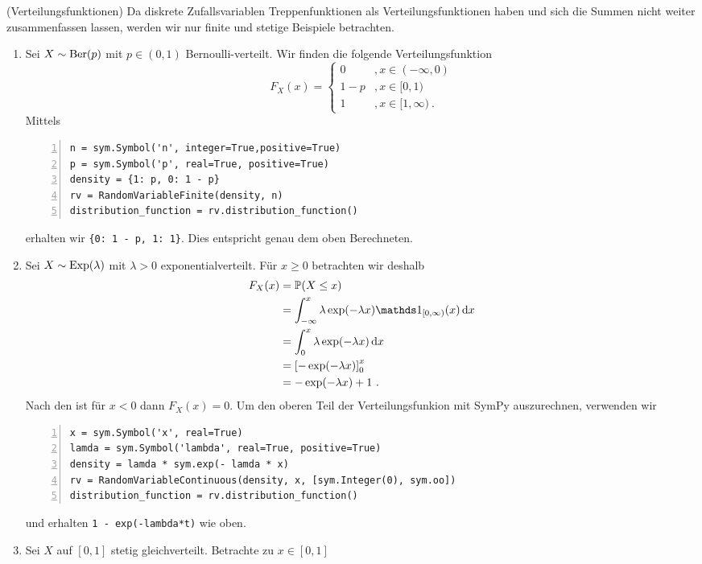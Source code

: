 \begin{Beispiel}{(Verteilungsfunktionen)}
\hypertarget{Bsp:VertFun}{}Da diskrete Zufallsvariablen Treppenfunktionen als Verteilungsfunktionen haben und sich die Summen nicht weiter zusammenfassen lassen, werden wir nur finite und stetige Beispiele betrachten.
\begin{enumerate}[label=(\roman*)]
\item Sei $X \sim \operatorname{Ber}(p)$ mit $p \in (0, 1)$ Bernoulli-verteilt. Wir finden die folgende Verteilungsfunktion
\[F_X(x) = \begin{cases}
0 &, x \in (- \infty, 0)\\
1 - p &, x \in [0, 1)\\
1 &, x \in [1, \infty)~.
\end{cases}\]
Mittels
\begin{lstlisting}[numbers=left, numberstyle=\tiny\color{codegray}]
n = sym.Symbol('n', integer=True,positive=True)
p = sym.Symbol('p', real=True, positive=True)
density = {1: p, 0: 1 - p}
rv = RandomVariableFinite(density, n)
distribution_function = rv.distribution_function()
\end{lstlisting}
erhalten wir \lstinline|{0: 1 - p, 1: 1}|. Dies entspricht genau dem oben Berechneten.
\item Sei $X \sim \operatorname{Exp}(\lambda)$ mit $\lambda > 0$ exponentialverteilt. Für $x \geq 0$ betrachten wir deshalb
\begin{align*}
F_X(x) &= \mathbb{P}(X \leq x)\\
&= \int_{-\infty}^x \lambda \exp(- \lambda x) \indi_{[0, \infty)}(x) \d x\\
&= \int_0^x \lambda \exp(- \lambda x) \d x\\
&= \left[ - \exp(- \lambda x) \right]_0^x\\
&= - \exp(- \lambda x) + 1~.
\end{align*}
Nach den \hyperlink{Satz:EigVertFun}{} ist für $x < 0$ dann $F_X(x) = 0$. Um den oberen Teil der Verteilungsfunkion mit SymPy auszurechnen, verwenden wir
\begin{lstlisting}[numbers=left, numberstyle=\tiny\color{codegray}]
x = sym.Symbol('x', real=True)
lamda = sym.Symbol('lambda', real=True, positive=True)
density = lamda * sym.exp(- lamda * x)
rv = RandomVariableContinuous(density, x, [sym.Integer(0), sym.oo])
distribution_function = rv.distribution_function()
\end{lstlisting}
und erhalten \lstinline|1 - exp(-lambda*t)| wie oben.
\item Sei $X$ auf $[0, 1]$ stetig gleichverteilt. Betrachte zu $x \in [0, 1]$

\end{enumerate}
\end{Beispiel}

